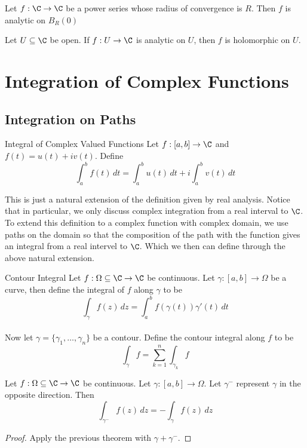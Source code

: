\documentclass[a4paper]{article}
\begin{document}
\begin{prp}{}{} Let $f:\C\to\C$ be a power series whose radius of convergence is $R$. Then $f$ is analytic on $B_R(0)$
\end{prp}

\begin{crl}{}{} Let $U\subseteq\C$ be open. If $f:U\to\C$ is analytic on $U$, then $f$ is holomorphic on $U$. 
\end{crl}

\pagebreak
\section{Integration of Complex Functions}
\subsection{Integration on Paths}
\begin{defn}{Integral of Complex Valued Functions}{} Let $f:[a,b]\to\C$ and $f(t)=u(t)+iv(t)$. Define $$\int_a^bf(t)\,dt=\int_a^bu(t)\,dt+i\int_a^bv(t)\,dt$$
\end{defn}

This is just a natural extension of the definition given by real analysis. Notice that in particular, we only discuss complex integration from a real interval to $\C$. To extend this definition to a complex function with complex domain, we use paths on the domain so that the composition of the path with the function gives an integral from a real intervel to $\C$. Which we then can define through the above natural extension. 

\begin{defn}{Contour Integral}{} Let $f:\Omega\subseteq\C\to\C$ be continuous. Let $\gamma:[a,b]\to\Omega$ be a curve, then define the integral of $f$ along $\gamma$ to be $$\int_{\gamma}f(z)\,dz=\int_a^bf(\gamma(t))\gamma'(t)\,dt$$~\\
Now let $\gamma=\{\gamma_1,\dots,\gamma_n\}$ be a contour. Define the contour integral along $f$ to be $$\int_{\gamma}f=\sum_{k=1}^n\int_{\gamma_k}f$$
\end{defn}

\begin{prp}{}{} Let $f:\Omega\subseteq\C\to\C$ be continuous. Let $\gamma:[a,b]\to\Omega$. Let $\gamma^-$ represent $\gamma$ in the opposite direction. Then $$\int_{\gamma^-}f(z)\,dz=-\int_\gamma f(z)\,dz$$ 
\begin{proof} Apply the previous theorem with $\gamma+\gamma^-$. 
\end{proof}
\end{prp}
\end{document}
